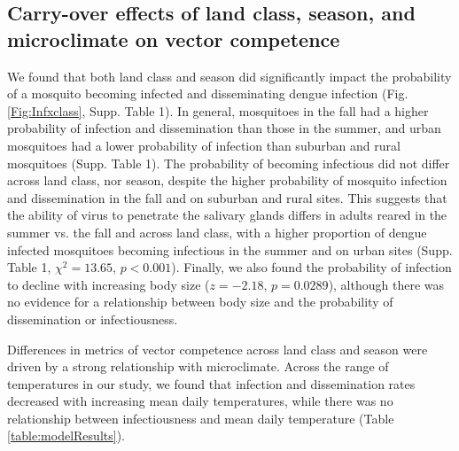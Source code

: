 \documentclass[12pt]{article}
\begin{document}
\subsection{Carry-over effects of land class, season, and microclimate on vector competence}

We found that both land class and season did significantly impact the probability of a mosquito becoming infected and disseminating dengue infection (Fig. \ref{Fig:Infxclass}, Supp. Table 1). In general, mosquitoes in the fall had a higher probability of infection and dissemination  than those in the summer, and urban mosquitoes had a lower probability of infection than suburban and rural mosquitoes (Supp. Table 1). The probability of becoming infectious did not differ across land class, nor season, despite the higher probability of mosquito infection and dissemination in the fall and on suburban and rural sites. This suggests that the ability of virus to penetrate the salivary glands differs in adults reared in the summer vs. the fall and across land class, with a higher proportion of dengue infected mosquitoes becoming infectious in the summer and on urban sites (Supp. Table 1, $\chi^2=13.65$, $p<0.001$). Finally, we also found the probability of infection to decline with increasing body size ($z=-2.18$, $p=0.0289$), although there was no evidence for a relationship between body size and the probability of dissemination or infectiousness.

Differences in metrics of vector competence across land class and season were driven by a strong relationship with microclimate. Across the range of temperatures in our study, we found that infection and dissemination rates decreased with increasing mean daily temperatures, while there was no relationship between infectiousness and mean daily temperature (Table \ref{table:modelResults}).
\end{document}
